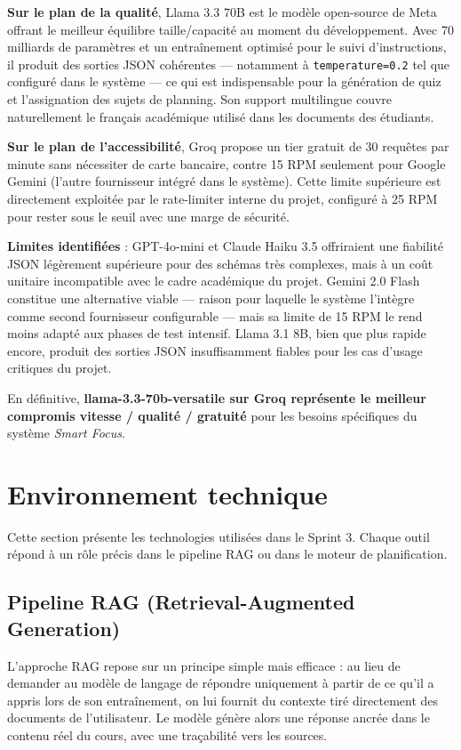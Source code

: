 \textbf{Sur le plan de la qualité}, Llama 3.3 70B est le modèle open-source
de Meta offrant le meilleur équilibre taille/capacité au moment du développement.
Avec 70 milliards de paramètres et un entraînement optimisé pour le suivi
d'instructions, il produit des sorties JSON cohérentes — notamment à
\texttt{temperature=0.2} tel que configuré dans le système — ce qui est
indispensable pour la génération de quiz et l'assignation des sujets de planning.
Son support multilingue couvre naturellement le français académique utilisé dans
les documents des étudiants.

\textbf{Sur le plan de l'accessibilité}, Groq propose un tier gratuit de 30
requêtes par minute sans nécessiter de carte bancaire, contre 15 RPM seulement
pour Google Gemini (l'autre fournisseur intégré dans le système). Cette limite
supérieure est directement exploitée par le rate-limiter interne du projet,
configuré à 25 RPM pour rester sous le seuil avec une marge de sécurité.

\textbf{Limites identifiées} : GPT-4o-mini et Claude Haiku 3.5 offriraient une
fiabilité JSON légèrement supérieure pour des schémas très complexes, mais à un
coût unitaire incompatible avec le cadre académique du projet. Gemini 2.0 Flash
constitue une alternative viable — raison pour laquelle le système l'intègre
comme second fournisseur configurable — mais sa limite de 15 RPM le rend moins
adapté aux phases de test intensif. Llama 3.1 8B, bien que plus rapide encore,
produit des sorties JSON insuffisamment fiables pour les cas d'usage critiques
du projet.

En définitive, \textbf{llama-3.3-70b-versatile sur Groq représente le meilleur
compromis vitesse / qualité / gratuité} pour les besoins spécifiques du système
\textit{Smart Focus}.

\section{Environnement technique}

Cette section présente les technologies utilisées dans le Sprint 3. Chaque outil répond à un rôle précis dans le pipeline RAG ou dans le moteur de planification.

\subsection{Pipeline RAG (Retrieval-Augmented Generation)}

L'approche RAG repose sur un principe simple mais efficace : au lieu de demander au modèle de langage de répondre uniquement à partir de ce qu'il a appris lors de son entraînement, on lui fournit du contexte tiré directement des documents de l'utilisateur. Le modèle génère alors une réponse ancrée dans le contenu réel du cours, avec une traçabilité vers les sources.

